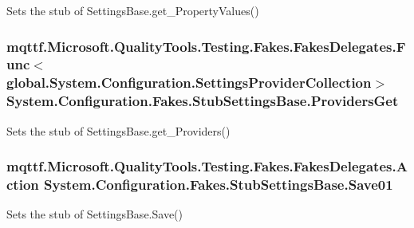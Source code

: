 Sets the stub of Settings\-Base.\-get\-\_\-\-Property\-Values()

\hypertarget{class_system_1_1_configuration_1_1_fakes_1_1_stub_settings_base_a882ba11dbd1120fdb06d2b55b12cc50e}{
\subsubsection[{Providers\-Get}]{\setlength{\rightskip}{0pt plus 5cm}mqttf.\-Microsoft.\-Quality\-Tools.\-Testing.\-Fakes.\-Fakes\-Delegates.\-Func$<$global.\-System.\-Configuration.\-Settings\-Provider\-Collection$>$ System.\-Configuration.\-Fakes.\-Stub\-Settings\-Base.\-Providers\-Get}}\label{class_system_1_1_configuration_1_1_fakes_1_1_stub_settings_base_a882ba11dbd1120fdb06d2b55b12cc50e}


Sets the stub of Settings\-Base.\-get\-\_\-\-Providers()

\hypertarget{class_system_1_1_configuration_1_1_fakes_1_1_stub_settings_base_a6e105316063a5be8fd5db374127eee82}{
\subsubsection[{Save01}]{\setlength{\rightskip}{0pt plus 5cm}mqttf.\-Microsoft.\-Quality\-Tools.\-Testing.\-Fakes.\-Fakes\-Delegates.\-Action System.\-Configuration.\-Fakes.\-Stub\-Settings\-Base.\-Save01}}\label{class_system_1_1_configuration_1_1_fakes_1_1_stub_settings_base_a6e105316063a5be8fd5db374127eee82}


Sets the stub of Settings\-Base.\-Save()



